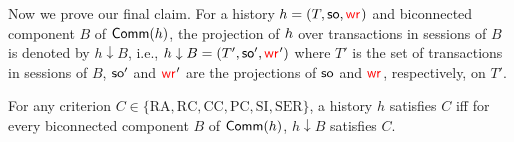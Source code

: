 \medskip
Now we prove our final claim. For a history ${h} = (T, \mathsf{so}, \textcolor{red}{\mathsf{wr}_{}})$ and biconnected component $B$ of $\mathsf{Comm}({h})$, the projection of ${h}$ over transactions in sessions of $B$ is denoted by $h\downarrow B$, i.e., $h\downarrow B=(T', \mathsf{so}', \textcolor{red}{\mathsf{wr}_{}}')$ where $T'$ is the set of transactions in sessions of $B$, $\mathsf{so}'$ and $\textcolor{red}{\mathsf{wr}_{}}'$ are the projections of $\mathsf{so}$ and $\textcolor{red}{\mathsf{wr}_{}}$, respectively, on $T'$.

\begin{theorem}\label{th:comm_graph}
For any criterion $C\in\{\text{RA},\text{RC},\text{CC},\text{PC},\text{SI},\text{SER}\}$, a history $h$ satisfies $C$ iff for every biconnected component $B$ of $\mathsf{Comm}({h})$, $h\downarrow B$ satisfies $C$.
\end{theorem}
